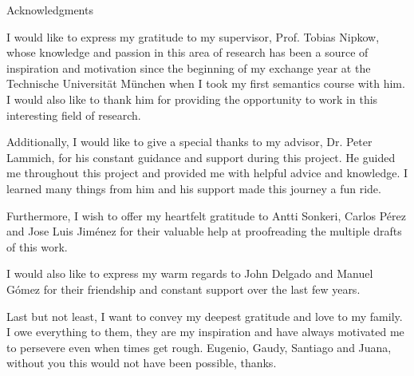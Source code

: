 \thispagestyle{empty}

\vspace*{2cm}

\begin{center}
{ Acknowledgments}

\vspace{1cm}

I would like to express my gratitude to my supervisor, Prof. Tobias Nipkow, whose knowledge and passion in this area of research has been a source of inspiration and motivation since the beginning of my exchange year at the Technische Universität München when I took my first semantics course with him.
I would also like to thank him for providing the opportunity to work in this interesting field of research.

Additionally, I would like to give a special thanks to my advisor, Dr. Peter Lammich, for his constant guidance and support during this project.
He guided me throughout this project and provided me with helpful advice and knowledge.
I learned many things from him and his support made this journey a fun ride.

Furthermore, I wish to offer my heartfelt gratitude to Antti Sonkeri, Carlos Pérez and Jose Luis Jiménez for their valuable help at proofreading the multiple drafts of this work.

I would also like to express my warm regards to John Delgado and Manuel Gómez for their friendship and constant support over the last few years.

Last but not least, I want to convey my deepest gratitude and love to my family.
I owe everything to them, they are my inspiration and have always motivated me to persevere even when times get rough.
Eugenio, Gaudy, Santiago and Juana, without you this would not have been possible, thanks.

\end{center}

\vspace{1cm}


\cleardoublepage{}
